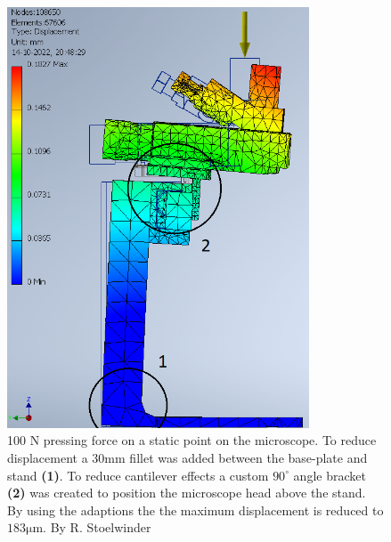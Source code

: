 \documentclass[10pt]{article}
\begin{document}
\begin{figure}[H]
  \centering
  \begin{minipage}[b]{0.45\textwidth}
    \includegraphics[width=0.8\textwidth]{img/rigidity_simulation/study_4.png}
    \caption{100 N pressing force on a static point on the microscope. To reduce displacement a $30\mathrm{mm}$ fillet was added between the base-plate and stand \textbf{(1)}. To reduce cantilever effects a custom $90^\circ$ angle bracket \textbf{(2)} was created to position the microscope head above the stand. By using the adaptions the the maximum displacement is reduced to $183\mathrm{\mu m}$. By R. Stoelwinder }
    \label{fig:disp_study4}
  \end{minipage}
  \hfill
  \begin{minipage}[b]{0.45\textwidth}

\end{minipage}
\end{figure}
\end{document}
